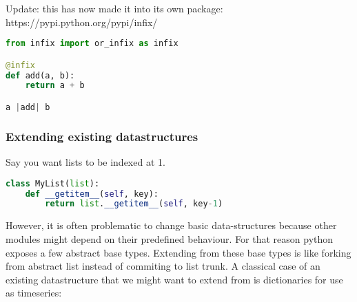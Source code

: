 Update: this has now made it into its own package: https://pypi.python.org/pypi/infix/

\begin{lstlisting}[language=python]
from infix import or_infix as infix

@infix
def add(a, b):
    return a + b

a |add| b
\end{lstlisting}


\subsubsection{Extending existing datastructures}

Say you want lists to be indexed at 1. 
\begin{lstlisting}[language=python]
class MyList(list):
    def __getitem__(self, key):
        return list.__getitem__(self, key-1)
\end{lstlisting}

However, it is often problematic to change basic data-structures because other modules might depend on their predefined behaviour. For that reason python exposes a few abstract base types. Extending from these base types is like forking from abstract list instead of commiting to list trunk. A classical case of an existing datastructure that we might want to extend from is dictionaries for use as timeseries: 

